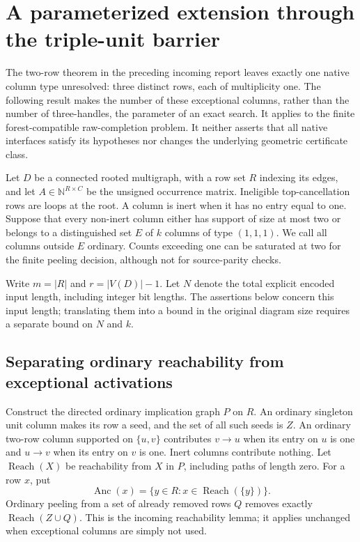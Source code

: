 \section{A parameterized extension through the triple-unit barrier}
\label{sec:exceptional-triples}

The two-row theorem in the preceding incoming report leaves exactly one
native column type unresolved: three distinct rows, each of multiplicity
one.  The following result makes the number of these exceptional columns,
rather than the number of three-handles, the parameter of an exact search.
It applies to the finite forest-compatible raw-completion problem.  It
neither asserts that all native interfaces satisfy its hypotheses nor
changes the underlying geometric certificate class.

Let $D$ be a connected rooted multigraph, with a row set $R$ indexing its
edges, and let $A\in\mathbb N^{R\times C}$ be the unsigned occurrence
matrix.  Ineligible top-cancellation rows are loops at the root.  A column
is inert when it has no entry equal to one.  Suppose that every non-inert
column either has support of size at most two or belongs to a distinguished
set $E$ of $k$ columns of type $(1,1,1)$.  We call all columns outside $E$
ordinary.  Counts exceeding one can be saturated at two for the finite
peeling decision, although not for source-parity checks.

Write $m=|R|$ and $r=|V(D)|-1$.  Let $N$ denote the total explicit encoded
input length, including integer bit lengths.  The assertions below concern
this input length; translating them into a bound in the original diagram
size requires a separate bound on $N$ and $k$.

\subsection{Separating ordinary reachability from exceptional activations}

Construct the directed ordinary implication graph $P$ on $R$.  An ordinary
singleton unit column makes its row a seed, and the set of all such seeds
is $Z$.  An ordinary two-row column supported on $\{u,v\}$ contributes
$v\to u$ when its entry on $u$ is one and $u\to v$ when its entry on $v$
is one.  Inert columns contribute nothing.  Let $\operatorname{Reach}(X)$
be reachability from $X$ in $P$, including paths of length zero.  For a row
$x$, put
\[
       \operatorname{Anc}(x)=\{y\in R:x\in\operatorname{Reach}(\{y\})\}.
\]
Ordinary peeling from a set of already removed rows $Q$ removes exactly
$\operatorname{Reach}(Z\cup Q)$.  This is the incoming reachability lemma;
it applies unchanged when exceptional columns are simply not used.


